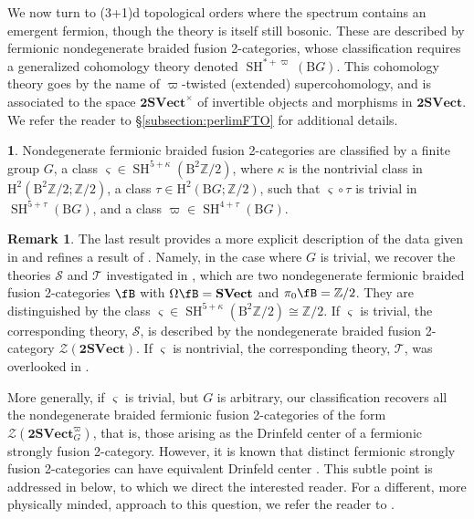 \documentclass[11pt,reqno]{amsart}
\newcommand{\Z}{\mathbb{Z}}
\DeclareMathOperator{\SH}{SH}
\newcommand{\SVect}{\mathbf{SVect}}
\newcommand{\tSVect}{\mathbf{2SVect}}
\newcommand{\cZ}{\mathcal{Z}}
\newcommand{\rH}{\mathrm{H}}
\newcommand{\rB}{\mathrm{B}}
\numberwithin{equation}{section}
\theoremstyle{plain}
\theoremstyle{definition}
\newtheorem{rem}[equation]{Remark}
\newtheorem*{FermionicNondegen}{\Cref{FermionicNondegen}}
\begin{document}
We now turn to (3+1)d topological orders where the spectrum contains an emergent fermion, though the theory is itself still bosonic. These are described by fermionic nondegenerate braided fusion 2-categories, whose classification requires a generalized cohomology theory denoted $\SH^{*+\varpi}(\rB G)$. This cohomology theory goes by the name of $\varpi$-twisted (extended) supercohomology, and is associated to the space $\tSVect^\times$ of invertible objects and morphisms in $\tSVect$. We refer the reader to \S\ref{subsection:perlimFTO} for additional details.

\begin{FermionicNondegen}\label{thm:nondegenFermionic}
    Nondegenerate fermionic braided fusion 2-categories are classified by a finite group $G$, a class $\varsigma \in \SH^{5+\kappa}(\rB^2 \Z/2)$, where $\kappa$ is the nontrivial class in $\rH^2(\rB^2 \Z/2;\Z/2)$, a class $\tau\in \rH^2(\rB G;\Z/2)$, such that $\varsigma \circ \tau$ is trivial in $\SH^{5+\tau}(\rB G)$, and a class $\varpi \in \SH^{4+\tau}(\rB G)$.
\end{FermionicNondegen}
\begin{rem}\label{rem:recoverFermionic}
The last result provides a more explicit description of the data given in \cite[Corollary V.5]{JF} and refines a result of \cite{Lan_2019}.
Namely, in the case where $G$ is trivial, we recover the theories $\mathcal{S}$ and $\mathcal{T}$ investigated in \cite{JF2,JFR}, which are two nondegenerate fermionic braided fusion 2-categories $\fB$ with $\Omega\fB = \SVect$ and $\pi_0 \fB =\Z/2$. They are distinguished by the class $\varsigma\in\SH^{5+\kappa}(\rB^2 \Z/2)\cong\mathbb{Z}/2$. If $\varsigma$ is trivial, the corresponding theory, $\mathcal{S}$, is described by the nondegenerate braided fusion 2-category $\mathcal{Z}(\tSVect)$. If $\varsigma$ is nontrivial, the corresponding theory, $\mathcal{T}$, was overlooked in \cite{Lan_2019}.

More generally, if $\varsigma$ is trivial, but $G$ is arbitrary, our classification recovers all the nondegenerate braided fermionic fusion 2-categories of the form $\cZ(\tSVect^\varpi_G)$, that is, those arising as the Drinfeld center of a fermionic strongly fusion 2-category. However, it is known that distinct fermionic strongly fusion 2-categories can have equivalent Drinfeld center \cite{D9}.
This subtle point is addressed in  below, to which we direct the interested reader.
For a different, more physically minded, approach to this question, we refer the reader to \cite{Teixeira:2025qsg}.
\end{rem}
\end{document}
